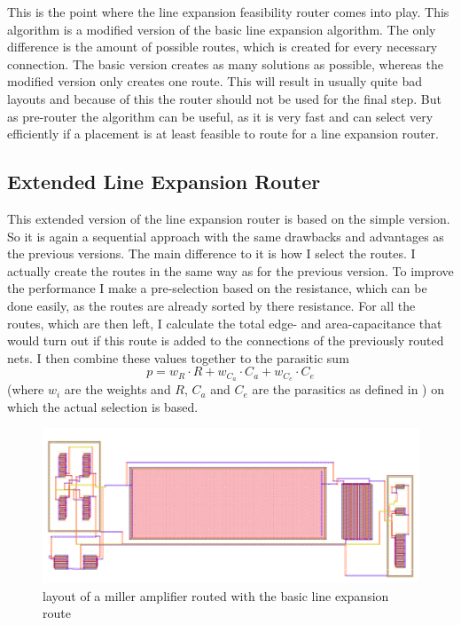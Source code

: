 This is the point where the line expansion feasibility router comes into play. This algorithm is a modified version of the basic line expansion algorithm. The only difference is the amount of possible routes, which is created for every necessary connection. The basic version creates as many solutions as possible, whereas the modified version only creates one route. This will result in usually quite bad layouts and because of this the router should not be used for the final step. But as pre-router the algorithm can be useful, as it is very fast and can select very efficiently if a placement is at least feasible to route for a line expansion router.

\subsection{Extended Line Expansion Router}
This extended version of the line expansion router is based on the simple version. So it is again a sequential approach with the same drawbacks and advantages as the previous versions. The main difference to it is how I select the routes. I actually create the routes in the same way as for the previous version. To improve the performance I make a pre-selection based on the resistance, which can be done easily, as the routes are already sorted by there resistance. For all the routes, which are then left, I calculate the total edge- and area-capacitance that would turn out if this route is added to the connections of the previously routed nets. I then combine these values together to the parasitic sum
\begin{equation}
	\label{eq:extended_line_expansion_objective}
	p = w_R \cdot R + w_{C_a} \cdot C_a + w_{C_e} \cdot C_e
\end{equation}
(where $w_i$ are the weights and $R$, $C_a$ and $C_e$ are the parasitics as defined in ) on which the actual selection is based.

\begin{figure}
	\centering
	\includegraphics[scale=.4]{FIG/miller_amplifier_routed_extended_line_expansion_2.png}
  	\caption{layout of a miller amplifier routed with the basic line expansion route}
	\label{fig:miller_amplifier_routed_extended_line_expansion_2}
\end{figure}	